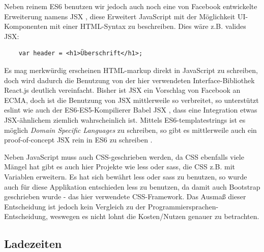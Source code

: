 \documentclass[12pt,twoside]{book}
\begin{document}
Neben reinem ES6 benutzen wir jedoch auch noch eine von Facebook entwickelte Erweiterung namens JSX \cite{jsx}, diese Erweitert JavaScript mit der Möglichkeit UI-Komponenten mit einer HTML-Syntax zu beschreiben. Dies wäre z.B. valides JSX:

\begin{verbatim}
	var header = <h1>Überschrift</h1>;
\end{verbatim}

Es mag merkwürdig erscheinen HTML-markup direkt in JavaScript zu schreiben, doch wird dadurch die Benutzung von der hier verwendeten Interface-Bibliothek React.js deutlich vereinfacht.
Bisher ist JSX ein Vorschlag von Facebook an ECMA, doch ist die Benutzung von JSX mittlerweile so verbreitet, so unterstützt eslint \cite{eslint} wie auch der ES6-ES5-Kompilierer Babel JSX \cite{babel}, dass eine Integration etwas JSX-ähnlichem ziemlich wahrscheinlich ist.
Mittels ES6-templatestrings ist es möglich \textit{Domain Specific Languages} zu schreiben, so gibt es mittlerweile auch ein proof-of-concept JSX rein in ES6 zu schreiben \cite{templatestrings}.

Neben JavaScript muss auch CSS-geschrieben werden, da CSS ebenfalls viele Mängel hat gibt es auch hier Projekte wie less oder sass, die CSS z.B. mit Variablen erweitern. Es hat sich bewährt less oder sass zu benutzen, so wurde auch für diese Applikation entschieden less zu benutzen, da damit auch Bootstrap geschrieben wurde - das hier verwendete CSS-Framework.
Das Ausmaß dieser Entscheidung ist jedoch kein Vergleich zu der Programmiersprachen-Entscheidung, weswegen es nicht lohnt die Kosten/Nutzen genauer zu betrachten.

\subsection{Ladezeiten}\label{sec:loadingtimes}
\end{document}
